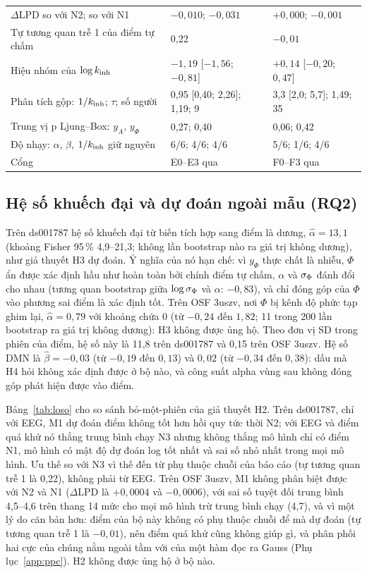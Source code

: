 \begin{table}[t]
\begin{tabular}{lll}
$\Delta$LPD so với N2; so với N1         & $-0{,}010$; $-0{,}031$ & $+0{,}000$; $-0{,}001$ \\
Tự tương quan trễ 1 của điểm tự chấm     & 0,22 & $-0{,}01$ \\
Hiệu nhóm của $\log k_{\mathrm{inh}}$                & $-1{,}19$ [$-1{,}56$; $-0{,}81$] & $+0{,}14$ [$-0{,}20$; $0{,}47$] \\
Phân tích gộp: $1/k_{\mathrm{inh}}$; $\tau$; số người & 0,95 [0,40; 2,26]; 1,19; 9 & 3,3 [2,0; 5,7]; 1,49; 35 \\
Trung vị p Ljung--Box: $y_A$, $y_\Phi$   & 0,27; 0,40 & 0,06; 0,42 \\
Độ nhạy: $\alpha$, $\beta$, $1/k_{\mathrm{inh}}$ giữ nguyên & 6/6; 4/6; 4/6 & 5/6; 1/6; 4/6 \\
Cổng                                     & E0--E3 qua & F0--F3 qua \\
\bottomrule
\end{tabular}
\end{table}

\subsection{Hệ số khuếch đại và dự đoán ngoài mẫu (RQ2)}
Trên ds001787 hệ số khuếch đại từ biến tích hợp sang điểm là dương, $\hat\alpha=13{,}1$ (khoảng Fisher 95\,\% 4,9--21,3; không lần bootstrap nào ra giá trị không dương), như giả thuyết H3 dự đoán. Ý nghĩa của nó hạn chế: vì $y_\Phi$ thực chất là nhiễu, $\Phi$ ẩn được xác định hầu như hoàn toàn bởi chính điểm tự chấm, $\alpha$ và $\sigma_{\Phi}$ đánh đổi cho nhau (tương quan bootstrap giữa $\log\sigma_{\Phi}$ và $\alpha$: $-0{,}83$), và chỉ đóng góp của $\Phi$ vào phương sai điểm là xác định tốt. Trên OSF 3uszv, nơi $\Phi$ bị kênh độ phức tạp ghim lại, $\hat\alpha=0{,}79$ với khoảng chứa 0 (từ $-0{,}24$ đến $1{,}82$; 11 trong 200 lần bootstrap ra giá trị không dương): H3 không được ủng hộ. Theo đơn vị SD trong phiên của điểm, hệ số này là 11,8 trên ds001787 và 0,15 trên OSF 3uszv. Hệ số DMN là $\hat\beta=-0{,}03$ (từ $-0{,}19$ đến $0{,}13$) và $0{,}02$ (từ $-0{,}34$ đến $0{,}38$): dấu mà H4 hỏi không xác định được ở bộ nào, và công suất alpha vùng sau không đóng góp phát hiện được vào điểm.

Bảng~\ref{tab:loso} cho so sánh bỏ-một-phiên của giả thuyết H2. Trên ds001787, chỉ với EEG, M1 dự đoán điểm không tốt hơn hồi quy tức thời N2; với EEG và điểm quá khứ nó thắng trung bình chạy N3 nhưng không thắng mô hình chỉ có điểm N1, mô hình có mật độ dự đoán log tốt nhất và sai số nhỏ nhất trong mọi mô hình. Ưu thế so với N3 vì thế đến từ phụ thuộc chuỗi của báo cáo (tự tương quan trễ 1 là 0,22), không phải từ EEG. Trên OSF 3uszv, M1 không phân biệt được với N2 và N1 ($\Delta\mathrm{LPD}$ là $+0{,}0004$ và $-0{,}0006$), với sai số tuyệt đối trung bình 4,5--4,6 trên thang 14 mức cho mọi mô hình trừ trung bình chạy (4,7), và vì một lý do căn bản hơn: điểm của bộ này không có phụ thuộc chuỗi để mà dự đoán (tự tương quan trễ 1 là $-0{,}01$), nên điểm quá khứ cũng không giúp gì, và phân phối hai cực của chúng nằm ngoài tầm với của một hàm đọc ra Gauss (Phụ lục~\ref{app:ppc}). H2 không được ủng hộ ở bộ nào.

